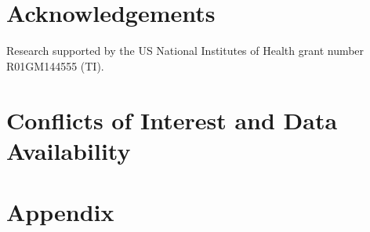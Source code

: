 \documentclass[iucr]{iucrjournals}
\begin{document}




\section*{Acknowledgements}
Research supported by the US National Institutes of Health grant number R01GM144555 (TI).

\section*{Conflicts of Interest and Data Availability} 





\section*{Appendix}
\appendix

\end{document}

